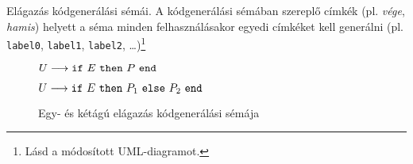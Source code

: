 Elágazás kódgenerálási sémái. A kódgenerálási sémában szereplő címkék (pl. \textit{vége},
\textit{hamis}) helyett a séma minden felhasználásakor egyedi címkéket kell generálni (pl. \texttt{label0}, \texttt{label1}, \texttt{label2}, \dots)\footnote{Lásd a módosított UML-diagramot.}

\begin{figure}[h]
	\begin{minipage}{0.5\linewidth}
		\begin{stuki*}[5cm]{$U \longrightarrow  \texttt{if} ~ E ~ \texttt{then} ~ P ~ \texttt{end}$}
		\end{stuki*}
	\end{minipage}
	\begin{minipage}{0.5\linewidth}
		\begin{stuki*}[5cm]{$U \longrightarrow  \texttt{if} ~ E ~ \texttt{then} ~ P_1 ~ \texttt{else} ~ P_2 ~ \texttt{end}$}
		\end{stuki*}
	\end{minipage}
	\caption{Egy- és kétágú elágazás kódgenerálási sémája}
\end{figure}

